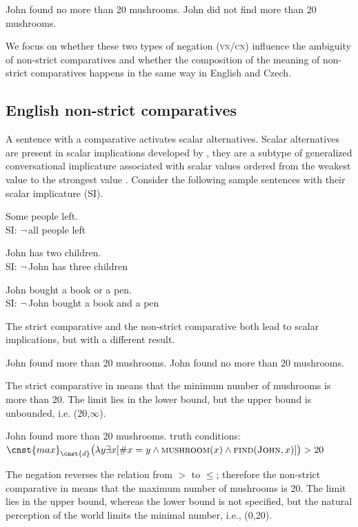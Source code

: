 \documentclass[output=paper,
]{langscibook}
\begin{document}
\ea \ea John found no more than 20 mushrooms.\label{ex:mush_cn} 
\ex John did not find more than 20 mushrooms.\label{ex:mush_vn}
\z
\z


\noindent We focus on whether these two types of negation (\textsc{vn/cn}) influence the ambiguity of non-strict comparatives and whether the composition of the meaning of non-strict comparatives happens in the same way in English and Czech.



\subsection{English non-strict comparatives}

A sentence with a comparative activates scalar alternatives. Scalar alternatives are present in scalar implications developed by \cite{horn1989natural,horn1996presupposition}, they are a subtype of generalized conversational implicature associated with scalar values ordered from the weakest value to the strongest value \citep{horn20135}. Consider the following sample sentences with their scalar implicature (SI).

\ea Some people left.\\
SI: $\neg\,$all people left
\z

\ea John has two children.\\
SI: $\neg\,$John has three children
\z

\ea John bought a book or a pen.\\
SI: $\neg\,$John bought a book and a pen
\z


\noindent The strict comparative  and the non-strict comparative  both lead to scalar implications, but with a different result.

\ea \ea John found more than 20 mushrooms.\label{ex:str}
\ex John found no more than 20 mushrooms.\label{ex:non_str}
\z
\z

\noindent The strict comparative in  means that the  minimum number of mushrooms is more than 20. The limit lies in the lower bound, but the upper bound is unbounded, i.e. (20,$\infty$).

\ea John found more than 20 mushrooms.
\ea truth conditions: $\cnst{max}_{\cnst{d}}\big(\lambda y\exists x[\#x=y \wedge \textsc{mushroom}(x) \wedge \textsc{find}(\textsc{John},x)]\big) > 20$ 
\z
\z


\noindent The negation reverses the relation from $>$ to $\leq$; therefore the non-strict comparative in  means that the maximum number of mushrooms is 20. The limit lies in the upper bound, whereas the lower bound is not specified, but the natural perception of the world limits the minimal number, i.e., (0,20).
\end{document}
